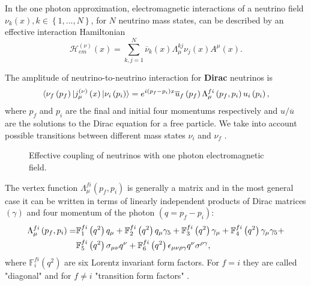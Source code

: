 In the one photon approximation, electromagnetic interactions of a neutrino field $\nu_k\left(x\right), k\in\left\lbrace 1,...,N\right\rbrace$, for $N$ neutrino mass states, can be described by an effective interaction Hamiltonian \cite{nuElmagInt2015.pdf}
\begin{equation}
\mathcal{H}^{\left(\nu\right)}_{em}\left(x\right)=\sum^N_{k,j=1}\overline{\nu}_k\left(x\right)\Lambda^{kj}_{\mu}\nu_j\left(x\right)A^{\mu}\left(x\right).
\end{equation}

The amplitude of neutrino-to-neutrino interaction for \textbf{Dirac} neutrinos is
\begin{equation}
\braket{\nu_f\left(p_f\right)|j^{\left(\nu\right)}_{\mu}\left(x\right)|\nu_i\left(p_i\right)}=
e^{i\left(p_f-p_i\right)x}\overline{u}_f\left(p_f\right)\Lambda^{fi}_{\mu}\left(p_f,p_i\right)u_i\left(p_i\right),
\end{equation}
where $p_f$ and $p_i$ are the final and initial four momentums respectively and $u/\overline{u}$ are the solutions to the Dirac equation for a free particle. We take into account possible transitions between different mass states $\nu_i$ and $\nu_f$ \cite{nuElmagInt2015.pdf}. 

\begin{figure}
\centering
{}
\caption{Effective coupling of neutrinos with one photon electromagnetic field.}
\label{figFeynman}
\end{figure}

The vertex function $\Lambda^{fi}_{\mu}\left(p_f,p_i\right)$ is generally a matrix and in the most general case it can be written in terms of linearly independent products of Dirac matrices $\left(\gamma\right)$ and four momentum of the photon $\left(q=p_f-p_i\right)$:
\begin{align}
\Lambda^{fi}_{\mu}\left(p_f,p_i\right)=&
\mathbb{F}^{fi}_1\left(q^2\right)q_{\mu}+
\mathbb{F}^{fi}_2\left(q^2\right)q_{\mu}\gamma_5+
\mathbb{F}^{fi}_3\left(q^2\right)\gamma_{\mu}+
\mathbb{F}^{fi}_4\left(q^2\right)\gamma_{\mu}\gamma_5+\notag\\ &
\mathbb{F}^{fi}_5\left(q^2\right)\sigma_{\mu\nu}q^{\nu}+
\mathbb{F}^{fi}_6\left(q^2\right)\epsilon_{\mu\nu\rho\gamma}q^{\nu}\sigma^{\rho\gamma},
\end{align}
where $\mathbb{F}^{fi}_i\left(q^2\right)$ are six Lorentz invariant form factors. For $f=i$ they are called "diagonal" and for $f\neq i$ "transition form factors" \cite{nuElmagInt2015.pdf}.

